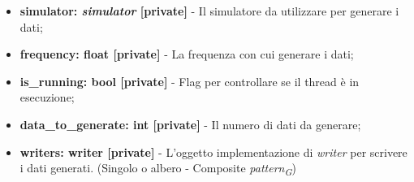 \begin{itemize}
\begin{itemize}
        \begin{itemize}
            \item \textbf{simulator: \textit{simulator} [private]} - Il simulatore da utilizzare per generare i dati;
            \item \textbf{frequency: float [private]} - La frequenza con cui generare i dati;
            \item \textbf{is\_running: bool [private]} - Flag per controllare se il thread è in esecuzione;
            \item \textbf{data\_to\_generate: int [private]} - Il numero di dati da generare;
            \item \textbf{writers: writer [private]} - L'oggetto implementazione di \textit{writer} per scrivere i dati generati. (Singolo o albero - Composite \textit{pattern}\textsubscript{\textit{G}})
        \end{itemize}


\end{itemize}
\end{itemize}
